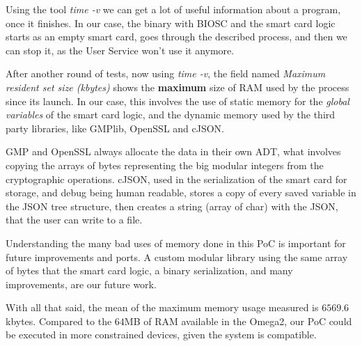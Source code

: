 Using the tool \textit{time -v} we can get a lot of useful information about a program, once it finishes. In our case, the binary with BIOSC and the smart card logic starts as an empty smart card, goes through the described process, and then we can stop it, as the User Service won't use it anymore.

After another round of tests, now using \textit{time -v}, the field named \textit{Maximum resident set size (kbytes)} shows the \textbf{maximum} size of RAM used by the process since its launch. In our case, this involves the use of static memory for the \textit{global variables} of the smart card logic, and the dynamic memory used by the third party libraries, like GMPlib, OpenSSL and cJSON.

GMP and OpenSSL always allocate the data in their own ADT, what involves copying the arrays of bytes representing the big modular integers from the cryptographic operations. cJSON, used in the serialization of the smart card for storage, and debug being human readable, stores a copy of every saved variable in the JSON tree structure, then creates a string (array of char) with the JSON, that the user can write to a file.

Understanding the many bad uses of memory done in this PoC is important for future improvements and ports. A custom modular library using the same array of bytes that the smart card logic, a binary serialization, and many improvements, are our future work.

With all that said, the mean of the maximum memory usage measured is $6569.6$ kbytes. Compared to the $64$MB of RAM available in the Omega2, our PoC could be executed in more constrained devices, given the system is compatible.































